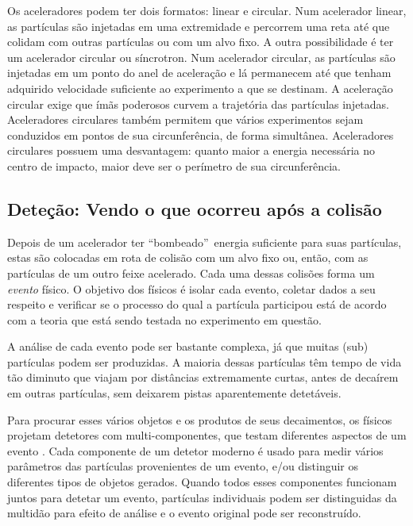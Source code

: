 Os aceleradores podem ter dois formatos: linear e
circular. Num acelerador linear, as partículas são
injetadas em uma extremidade e percorrem uma reta até que colidam com outras
partículas ou com um alvo fixo. A outra possibilidade é ter um acelerador
circular ou
síncrotron. Num acelerador circular, as partículas são injetadas em um ponto
do anel de aceleração e lá permanecem até que tenham adquirido velocidade
suficiente ao experimento a que se destinam. A aceleração circular exige que
ímãs poderosos curvem a trajetória das partículas injetadas. Aceleradores
circulares também permitem que vários experimentos sejam conduzidos em pontos
de sua circunferência, de forma simultânea. Aceleradores circulares possuem
uma desvantagem: quanto maior a energia necessária no centro de impacto, maior
deve ser o perímetro de sua circunferência.

\subsection{Deteção: Vendo o que ocorreu a\-pós a coli\-são}

Depois de um acelerador ter ``bombeado''\ energia suficiente para suas
par\-tí\-culas, estas são colocadas em rota de colisão com um alvo fixo ou,
então, com as partículas de um outro feixe acelerado. Cada uma dessas colisões
forma um \emph{evento} físico. O objetivo dos físicos é isolar cada evento,
coletar dados a seu respeito e verificar se o processo do qual a partícula
participou está de acordo com a teoria que está sendo testada no experimento
em questão.

A análise de cada evento pode ser bastante complexa, já que muitas (sub)
par\-tí\-cu\-las podem ser produzidas. A maioria dessas partículas têm tempo
de vida tão diminuto que viajam por distâncias extremamente curtas, antes de
decaírem em outras partículas, sem deixarem pistas aparentemente detetáveis.

Para procurar esses vários objetos e os produtos de seus decaimentos, os
físicos projetam detetores com multi-componentes, que testam diferentes
aspectos de um evento \cite{d0, cms, atlas-tp, booth}. Cada componente de um
detetor moderno é usado para medir vários parâmetros das partículas
provenientes de um evento, e/ou distinguir os diferentes tipos de objetos
gerados.  Quando todos esses componentes funcionam juntos para detetar um
evento, partículas individuais podem ser distinguidas da multidão para efeito
de análise e o evento original pode ser reconstruído.

